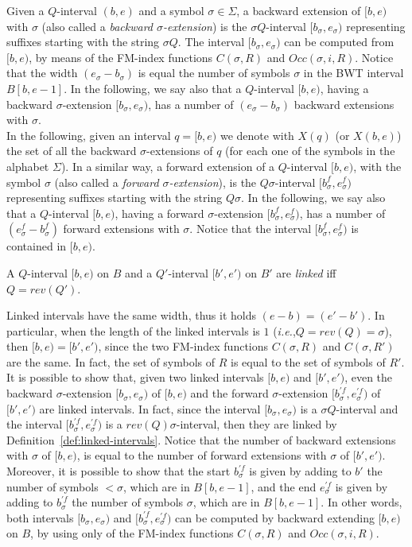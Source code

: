 \documentclass[runningheads,envcountsame,a4paper]{llncs}
\newcommand{\ie}{\textit{i.e.},\xspace}
\begin{document}
Given a $Q$-interval $(b,e)$ and a symbol $\sigma \in \Sigma$, a backward
extension of $[b,e)$ with $\sigma$ (also called a \emph{backward
$\sigma$-extension}) is the $\sigma Q$-interval $[b_{\sigma},e_{\sigma})$
representing suffixes starting with
the string $\sigma Q$. The interval $[b_{\sigma},e_{\sigma})$ can be computed
from $[b,e)$, by means of the FM-index functions $C(\sigma,R)$ and
$Occ(\sigma, i, R)$. Notice that the width $(e_{\sigma}-b_{\sigma})$ is equal
the number of symbols $\sigma$ in the BWT interval $B[b,e-1]$. In the following,
we say also that a  $Q$-interval $[b,e)$, having a backward $\sigma$-extension $[b_{\sigma},e_{\sigma})$, has a number of $(e_{\sigma}-b_{\sigma})$ backward
extensions with $\sigma$.\\
In the following, given an interval $q=[b,e)$ we denote with $X(q)$ (or $X(b,e)$)
the set of all the backward $\sigma$-extensions of $q$ (for each one of the
symbols in the alphabet $\Sigma$).
In a similar way, a forward extension of a $Q$-interval $[b,e)$, with the symbol
$\sigma$ (also called a \emph{forward $\sigma$-extension}), is the
$Q \sigma$-interval $[b^f_{\sigma},e^f_{\sigma})$ representing suffixes
starting with the string $Q \sigma$. In the following, we say also that a 
$Q$-interval $[b,e)$, having a forward $\sigma$-extension
$[b^f_{\sigma},e^f_{\sigma})$, has a number of $(e^f_{\sigma}-b^f_{\sigma})$
forward extensions with $\sigma$. Notice that the interval
$[b^f_{\sigma},e^f_{\sigma})$ is contained in $[b,e)$.

\begin{definition}
\label{def:linked-intervals}
A $Q$-interval $[b,e)$ on $B$ and a $Q'$-interval $[b',e')$ on $B'$ are
\emph{linked} iff $Q=rev(Q')$.
\end{definition}

Linked intervals have the same width, thus it holds
$(e-b)=(e'-b')$.
In particular, when the length of the linked intervals is $1$ (\ie $Q=rev(Q)=\sigma$), then $[b,e)=[b',e')$, since the two FM-index functions $C(\sigma, R)$ and $C(\sigma, R')$ are the same. In fact, the set of symbols of $R$ is equal to the set of symbols of $R'$.
It is possible to show that, given two linked intervals $[b,e)$ and $[b',e')$, even the backward $\sigma$-extension $[b_{\sigma},e_{\sigma})$ of $[b,e)$ and the forward $\sigma$-extension $[b^{'f}_{\sigma},e^{'f}_{\sigma})$ of $[b',e')$ are linked intervals. In fact, since the interval $[b_{\sigma},e_{\sigma})$ is a $\sigma Q$-interval and the interval $[b^{'f}_{\sigma},e^{'f}_{\sigma})$ is a $rev(Q) \sigma$-interval, then they are linked by Definition~\ref{def:linked-intervals}. 
Notice that the number of backward extensions with $\sigma$ of $[b,e)$, is equal to the number of forward extensions with $\sigma$ of $[b',e')$. Moreover,  it is possible to show \cite{Simpson10} that the start $b^{'f}_{\sigma}$ is given by adding to $b'$ the number of symbols $< \sigma$, which are in $B[b,e-1]$, and the end $e^{'f}_{\sigma}$ is given by adding to $b^{'f}_{\sigma}$ the number of symbols $\sigma$, which are in $B[b,e-1]$. In other words, both intervals $[b_{\sigma},e_{\sigma})$ and $[b^{'f}_{\sigma},e^{'f}_{\sigma})$ can be computed by backward extending $[b,e)$ on $B$, by using only of the FM-index functions $C(\sigma, R)$ and $Occ(\sigma, i, R)$.
\end{document}
